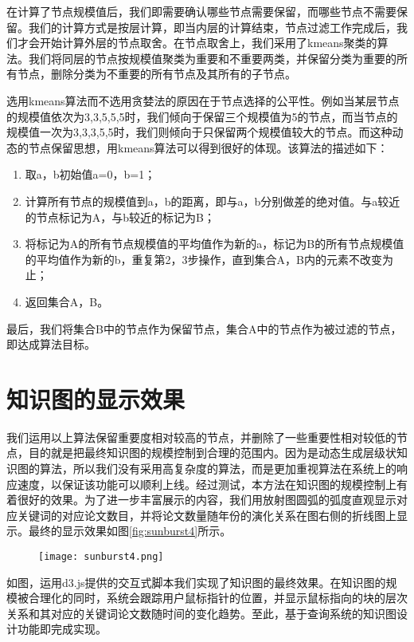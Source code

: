 在计算了节点规模值后，我们即需要确认哪些节点需要保留，而哪些节点不需要保留。我们的计算方式是按层计算，即当内层的计算结束，节点过滤工作完成后，我们才会开始计算外层的节点取舍。在节点取舍上，我们采用了kmeans聚类的算法。我们将同层的节点按规模值聚类为重要和不重要两类，并保留分类为重要的所有节点，删除分类为不重要的所有节点及其所有的子节点。

选用kmeans算法而不选用贪婪法的原因在于节点选择的公平性。例如当某层节点的规模值依次为{3,3,5,5,5}时，我们倾向于保留三个规模值为5的节点，而当节点的规模值一次为{3,3,3,5,5}时，我们则倾向于只保留两个规模值较大的节点。而这种动态的节点保留思想，用kmeans算法可以得到很好的体现。该算法的描述如下：

\begin{enumerate}
\item 取a，b初始值a=0，b=1；
\item 计算所有节点的规模值到a，b的距离，即与a，b分别做差的绝对值。与a较近的节点标记为A，与b较近的标记为B；
\item 将标记为A的所有节点规模值的平均值作为新的a，标记为B的所有节点规模值的平均值作为新的b，重复第2，3步操作，直到集合A，B内的元素不改变为止；
\item 返回集合A，B。
\end{enumerate}

最后，我们将集合B中的节点作为保留节点，集合A中的节点作为被过滤的节点，即达成算法目标。

\section{知识图的显示效果}
我们运用以上算法保留重要度相对较高的节点，并删除了一些重要性相对较低的节点，目的就是把最终知识图的规模控制到合理的范围内。因为是动态生成层级状知识图的算法，所以我们没有采用高复杂度的算法，而是更加重视算法在系统上的响应速度，以保证该功能可以顺利上线。经过测试，本方法在知识图的规模控制上有着很好的效果。为了进一步丰富展示的内容，我们用放射图圆弧的弧度直观显示对应关键词的对应论文数目，并将论文数量随年份的演化关系在图右侧的折线图上显示。最终的显示效果如图\ref{fig:sunburst4}所示。

\begin{figure}[!htp]
  \centering
  \texttt{[image: sunburst4.png]}
\end{figure}

如图，运用d3.js提供的交互式脚本我们实现了知识图的最终效果。在知识图的规模被合理化的同时，系统会跟踪用户鼠标指针的位置，并显示鼠标指向的块的层次关系和其对应的关键词论文数随时间的变化趋势。至此，基于查询系统的知识图设计功能即完成实现。